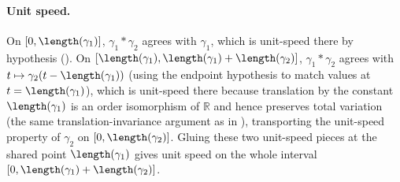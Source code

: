 \begin{definition}
  \paragraph{Unit speed.} On $[0,\length(\gamma_1)]$, $\gamma_1 * \gamma_2$ agrees with $\gamma_1$,
  which is unit-speed there by hypothesis (). On
  $[\length(\gamma_1),\length(\gamma_1)+\length(\gamma_2)]$, $\gamma_1*\gamma_2$ agrees with
  $t \mapsto \gamma_2(t-\length(\gamma_1))$ (using the endpoint hypothesis to match values at
  $t=\length(\gamma_1)$), which is unit-speed there because translation by the constant
  $\length(\gamma_1)$ is an order isomorphism of $\mathbb{R}$ and hence preserves total variation
  (the same translation-invariance argument as in ), transporting the
  unit-speed property of $\gamma_2$ on $[0,\length(\gamma_2)]$. Gluing these two unit-speed
  pieces at the shared point $\length(\gamma_1)$ gives unit speed on the whole interval
  $[0,\length(\gamma_1)+\length(\gamma_2)]$.
\end{definition}
